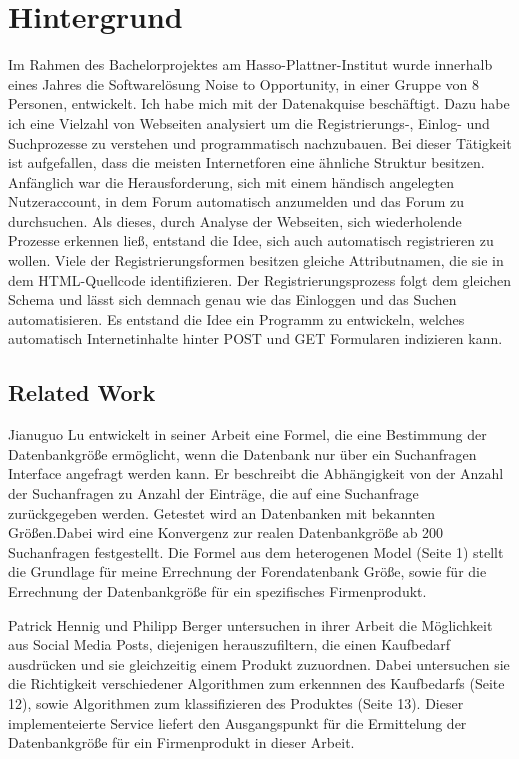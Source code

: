 \section{Hintergrund}

Im Rahmen des Bachelorprojektes am Hasso-Plattner-Institut wurde innerhalb eines Jahres die Softwarelösung Noise to Opportunity, in einer Gruppe von 8 Personen, entwickelt. Ich habe mich mit der Datenakquise beschäftigt. Dazu habe ich eine Vielzahl von Webseiten analysiert um die Registrierungs-, Einlog- und Suchprozesse zu verstehen und programmatisch nachzubauen. Bei dieser Tätigkeit ist aufgefallen, dass die meisten Internetforen eine ähnliche Struktur besitzen. Anfänglich war die Herausforderung, sich mit einem händisch angelegten Nutzeraccount, in dem Forum automatisch anzumelden und das Forum zu durchsuchen. Als dieses, durch Analyse der Webseiten, sich wiederholende Prozesse erkennen ließ, entstand die Idee, sich auch automatisch registrieren zu wollen.
Viele der Registrierungsformen besitzen gleiche Attributnamen, die sie in dem HTML-Quellcode identifizieren. Der Registrierungsprozess folgt dem gleichen Schema und lässt sich demnach genau wie das Einloggen und das Suchen automatisieren. Es entstand die Idee ein Programm zu entwickeln, welches automatisch Internetinhalte hinter POST und GET Formularen indizieren kann.

\subsection{Related Work}

Jianuguo Lu \cite{lu2008efficient} entwickelt in seiner Arbeit eine Formel, die eine Bestimmung der Datenbankgröße ermöglicht, wenn die Datenbank nur über ein Suchanfragen Interface angefragt werden kann. Er beschreibt die Abhängigkeit von der Anzahl der Suchanfragen zu Anzahl der Einträge, die auf eine Suchanfrage zurückgegeben werden. Getestet wird an Datenbanken mit bekannten Größen.Dabei wird eine Konvergenz zur realen Datenbankgröße ab 200 Suchanfragen festgestellt. Die Formel aus dem heterogenen Model (Seite 1) stellt die Grundlage für meine Errechnung der Forendatenbank Größe, sowie für die Errechnung der Datenbankgröße für ein spezifisches Firmenprodukt.

Patrick Hennig und Philipp Berger \cite{n2o} untersuchen in ihrer Arbeit die Möglichkeit aus Social Media Posts, diejenigen herauszufiltern, die einen Kaufbedarf ausdrücken und sie gleichzeitig einem Produkt zuzuordnen. Dabei untersuchen sie die Richtigkeit verschiedener Algorithmen zum erkennnen des Kaufbedarfs (Seite 12), sowie Algorithmen zum klassifizieren des Produktes (Seite 13). Dieser implementeierte Service liefert den Ausgangspunkt für die Ermittelung der Datenbankgröße für ein Firmenprodukt in dieser Arbeit.


